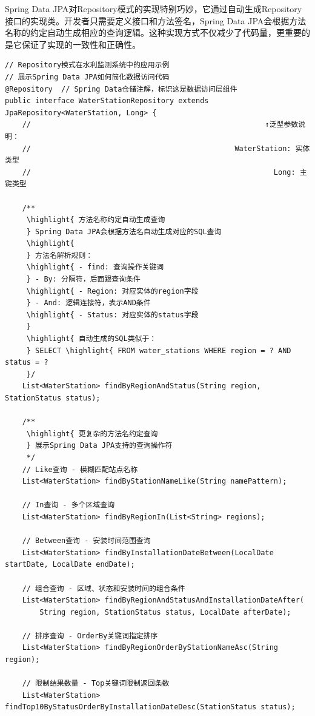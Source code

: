 Spring Data JPA对Repository模式的实现特别巧妙，它通过自动生成Repository接口的实现类。开发者只需要定义接口和方法签名，Spring Data JPA会根据方法名称的约定自动生成相应的查询逻辑。这种实现方式不仅减少了代码量，更重要的是它保证了实现的一致性和正确性。

\begin{lstlisting}[style=java]
// Repository模式在水利监测系统中的应用示例
// 展示Spring Data JPA如何简化数据访问代码
@Repository  // Spring Data仓储注解，标识这是数据访问层组件
public interface WaterStationRepository extends JpaRepository<WaterStation, Long> {
    //                                                      ↑泛型参数说明：
    //                                               WaterStation: 实体类型
    //                                                        Long: 主键类型
    
    /**
     \highlight{ 方法名称约定自动生成查询
     } Spring Data JPA会根据方法名自动生成对应的SQL查询
     \highlight{ 
     } 方法名解析规则：
     \highlight{ - find: 查询操作关键词
     } - By: 分隔符，后面跟查询条件
     \highlight{ - Region: 对应实体的region字段
     } - And: 逻辑连接符，表示AND条件
     \highlight{ - Status: 对应实体的status字段
     } 
     \highlight{ 自动生成的SQL类似于：
     } SELECT \highlight{ FROM water_stations WHERE region = ? AND status = ?
     }/
    List<WaterStation> findByRegionAndStatus(String region, StationStatus status);
    
    /**
     \highlight{ 更复杂的方法名约定查询
     } 展示Spring Data JPA支持的查询操作符
     */
    // Like查询 - 模糊匹配站点名称
    List<WaterStation> findByStationNameLike(String namePattern);
    
    // In查询 - 多个区域查询
    List<WaterStation> findByRegionIn(List<String> regions);
    
    // Between查询 - 安装时间范围查询
    List<WaterStation> findByInstallationDateBetween(LocalDate startDate, LocalDate endDate);
    
    // 组合查询 - 区域、状态和安装时间的组合条件
    List<WaterStation> findByRegionAndStatusAndInstallationDateAfter(
        String region, StationStatus status, LocalDate afterDate);
    
    // 排序查询 - OrderBy关键词指定排序
    List<WaterStation> findByRegionOrderByStationNameAsc(String region);
    
    // 限制结果数量 - Top关键词限制返回条数
    List<WaterStation> findTop10ByStatusOrderByInstallationDateDesc(StationStatus status);
    

\end{lstlisting}

